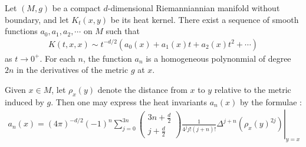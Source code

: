 \begin{proposition}\label{prop:asymptoticExpansion}
    Let $(M,g)$ be a compact $d$-dimensional Riemanniannian manifold without boundary, and let $K_t(x,y)$ be its heat kernel.  There exist a sequence of smooth functions $a_0,a_1, a_2,\cdots$ on $M$ such that
    \begin{align}\label{eq:asymptoticExpansion}
        K(t,x,x) \sim t^{-d/2}\left(a_0(x)+ a_1(x) t + a_2(x) t^2 +\cdots  \right)
    \end{align}
    as $t \to 0^+$.  For each $n$, the function $a_n$ is a homogeneous polynonmial of degree $2n$ in the derivatives of the metric $g$ at $x$.

\end{proposition}
Given $x\in M$, let $\rho_x(y)$ denote the distance from $x$ to $y$ relative to the metric induced by $g$.  Then one may express the heat invariants $a_n(x)$ by the formulae \cite[Theorem 1.2.1]{polterovichHeatInvariantsRiemannian2000}:
\begin{align}
    a_n(x) = \left.(4 \pi)^{-d / 2}(-1)^n \sum_{j=0}^{3 n}\left(\begin{array}{c}
                                                                        3 n+\frac{d}{2} \\
                                                                        j+\frac{d}{2}
                                                                    \end{array}\right) \frac{1}{4^j j !(j+n) !} \Delta^{j+n}\left(\rho_x(y)^{2 j}\right)\right|_{y=x}
\end{align}












